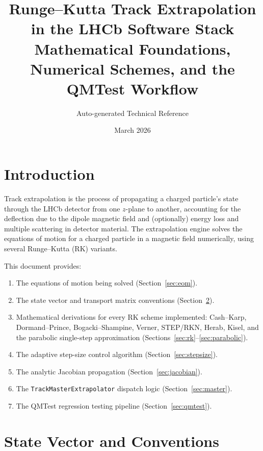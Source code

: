 \documentclass[11pt,a4paper]{article}
\title{%
  \textbf{Runge--Kutta Track Extrapolation in the LHCb Software Stack}\\[6pt]
  \large Mathematical Foundations, Numerical Schemes, and the QMTest Workflow
}
\author{Auto-generated Technical Reference}
\date{March 2026}
\begin{document}
\maketitle
\tableofcontents
\newpage

\section{Introduction}

Track extrapolation is the process of propagating a charged particle's state
through the LHCb detector from one $z$-plane to another, accounting for the
deflection due to the dipole magnetic field and (optionally) energy loss and
multiple scattering in detector material. The extrapolation engine solves the
equations of motion for a charged particle in a magnetic field numerically,
using several Runge--Kutta (RK) variants.

This document provides:
\begin{enumerate}[leftmargin=2em]
  \item The equations of motion being solved (Section~\ref{sec:eom}).
  \item The state vector and transport matrix conventions (Section~\ref{sec:statevec}).
  \item Mathematical derivations for every RK scheme implemented:
    Cash--Karp, Dormand--Prince, Bogacki--Shampine, Verner, STEP/RKN, Herab,
    Kisel, and the parabolic single-step approximation (Sections~\ref{sec:rk}--\ref{sec:parabolic}).
  \item The adaptive step-size control algorithm (Section~\ref{sec:stepsize}).
  \item The analytic Jacobian propagation (Section~\ref{sec:jacobian}).
  \item The \texttt{TrackMasterExtrapolator} dispatch logic (Section~\ref{sec:master}).
  \item The QMTest regression testing pipeline (Section~\ref{sec:qmtest}).
\end{enumerate}


\section{State Vector and Conventions}\label{sec:statevec}
\end{document}
